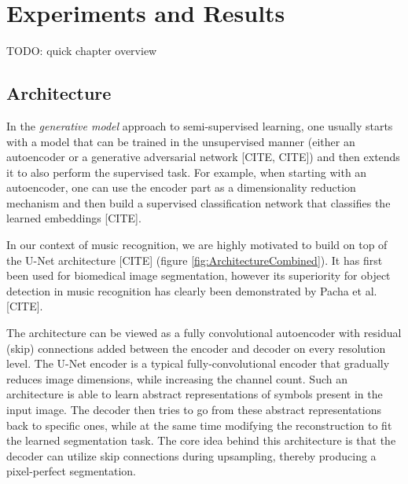 \chapter{Experiments and Results}
\label{chap:ExperimentsAndResults}

TODO: quick chapter overview



\section{Architecture}
\label{sec:Architecture}

In the \emph{generative model} approach to semi-supervised learning, one usually starts with a model that can be trained in the unsupervised manner (either an autoencoder or a generative adversarial network [CITE, CITE]) and then extends it to also perform the supervised task. For example, when starting with an autoencoder, one can use the encoder part as a dimensionality reduction mechanism and then build a supervised classification network that classifies the learned embeddings [CITE].

In our context of music recognition, we are highly motivated to build on top of the U-Net architecture [CITE] (figure \ref{fig:ArchitectureCombined}). It has first been used for biomedical image segmentation, however its superiority for object detection in music recognition has clearly been demonstrated by Pacha et al. [CITE].

The architecture can be viewed as a fully convolutional autoencoder with residual (skip) connections added between the encoder and decoder on every resolution level. The U-Net encoder is a typical fully-convolutional encoder that gradually reduces image dimensions, while increasing the channel count. Such an architecture is able to learn abstract representations of symbols present in the input image. The decoder then tries to go from these abstract representations back to specific ones, while at the same time modifying the reconstruction to fit the learned segmentation task. The core idea behind this architecture is that the decoder can utilize skip connections during upsampling, thereby producing a pixel-perfect segmentation.


